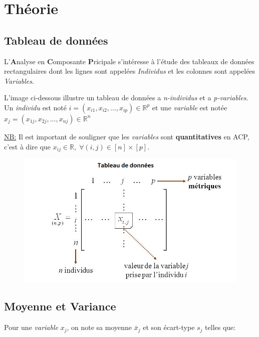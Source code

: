 \documentclass{article}
\begin{document}
\newpage

\section{Théorie}

\subsection{Tableau de données}

L'\textbf{A}nalyse en \textbf{C}omposante \textbf{P}ricipale s'intéresse à l'étude des tableaux de données rectangulaires dont les lignes sont appelées \textit{Individus} et les colonnes sont appelées \textit{Variables}.
\newline

L'image ci-dessous illustre un tableau de données a \textit{n-individus} et a \textit{p-variables}. Un \textit{individu} est noté $i=(x_{i1},x_{i2}, ... ,x_{ip}) \in \mathbb{R}^p$ et une \textit{variable} est notée $x_j=(x_{1j},x_{2j}, ... ,x_{nj}) \in \mathbb{R}^n$
\newline

\underline{NB:} Il est important de souligner que les \textit{variables} sont \textbf{quantitatives} en ACP, c'est à dire que $x_{ij} \in \mathbb{R}, \; \forall (i,j) \in [n]\times[p].$

\begin{figure}[h!]
\includegraphics[width=\linewidth]{images/tableau.png}
\end{figure}

\subsection{Moyenne et Variance}

Pour une \textit{variable} ${x_j}$, on note sa moyenne $\bar{x}_j$ et son écart-type $s_j$ telles que:
\end{document}
